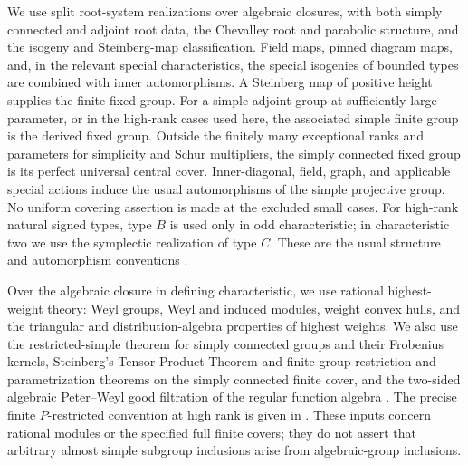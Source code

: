 \begin{convention}\label{f:conv-lie-inputs}
We use split root-system realizations over algebraic closures, with both
simply connected and adjoint root data, the Chevalley root and parabolic
structure, and the isogeny and Steinberg-map classification. Field maps,
pinned diagram maps, and, in the relevant special characteristics, the
special isogenies of bounded types are combined with inner automorphisms.
A Steinberg map of positive height supplies the finite fixed group.
For a simple adjoint group at sufficiently large parameter, or in the
high-rank cases used here, the associated simple finite group is the derived
fixed group. Outside the finitely many exceptional ranks and parameters for
simplicity and Schur multipliers, the simply connected fixed group is its
perfect universal central cover. Inner-diagonal, field, graph, and applicable
special actions induce the usual automorphisms of the simple projective
group. No uniform covering assertion is made at the excluded small cases.
For high-rank natural signed types, type $B$ is used only in odd
characteristic; in characteristic two we use the symplectic realization of
type $C$. These are the usual structure and automorphism conventions
\cite{GLS1994,Steinberg1968}.
\end{convention}

\begin{convention}\label{f:conv-representation-inputs}
Over the algebraic closure in defining characteristic, we use rational
highest-weight theory: Weyl groups, Weyl and induced modules, weight convex
hulls, and the triangular and distribution-algebra properties of highest
weights. We also use the restricted-simple theorem for simply connected
groups and their Frobenius kernels, Steinberg's Tensor Product Theorem and
finite-group restriction and parametrization theorems on the simply
connected finite cover, and the two-sided algebraic Peter--Weyl good
filtration of the regular function algebra
\cite{Steinberg1963,Jantzen2003,Humphreys2006}.
The precise finite $P$-restricted convention at high rank is given in
. These inputs concern rational modules or the specified
full finite covers; they do not assert that arbitrary almost simple subgroup
inclusions arise from algebraic-group inclusions.
\end{convention}

